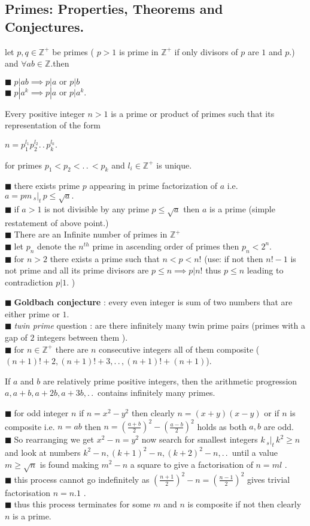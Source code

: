 \documentclass[11pt]{extarticle}
\newcommand{\Z}{\mathbb{Z}}
\newcommand{\w}[1]{\text{#1}}
\newcommand{\ck}{.\,.\,}
\newcommand{\snote}[1]{{\footnotesize(#1)}}
\newcommand{\st}{\,{}_{s}|_t\,}
\newcommand{\tbx}[2][]{
\begin{tcolorbox}[enhanced,breakable,size=small,colback=black!2!white,title={#1},arc is angular, arc=1.5mm,
	drop fuzzy shadow]
	#2
\end{tcolorbox}
}
\newcommand{\y}{$\blacksquare\;$}
\begin{document}
\begin{multicols}{2}
   \section{Primes: Properties, Theorems and Conjectures. }
   let $ p,q \in \Z^+$ be primes \snote{ $ p>1 $ is prime in $ \Z^+ $ if only divisors of $ p $ are $ 1 $ and $ p. $}  and $\forall ab\in \Z.$then
   \tbx{
   	\y $ p|ab \implies p|a\w{ or } p|b $ \\
   	\y $ p|a^k\implies p|a \w{ or } p|a^k.$
   }
   \tbx[Fundamental Theorem of Arithmetic]{ Every positive integer $ n>1 $ is a prime or product of primes such that its representation of the form 
   	\begin{center}
   		$ n=p_1^{l_1}p_2^{l_2}\ck p_k^{l_k} .$
   	\end{center} for primes $ p_1<p_2<\ck <p_k $ and $ l_i\in \Z^+  $   is unique.}
   \tbx{ 
   	\y  there exists prime $ p $ appearing in prime factorization of $ a $ i.e. $ a=pm \st p\leq \sqrt{a}. $ \\
   	\y if $ a>1 $ is not divisible by any prime $ p\leq \sqrt{a} $ then $ a $ is a prime \snote{simple restatement of above point.}\\
   	\y There are an Infinite number of primes in $ \Z^+ $ \\
   	\y let $ p_n $ denote the $ n^{th} $ prime in ascending order of primes then $ p_n<2^n. $\\
   	\y for $ n>2 $ there exists a prime such that $ n<p<n! $ \snote{use: if not then $ n!-1 $ is not prime and all its prime divisors are $ p\leq n \implies p|n! $ thus $ p\leq n $ leading to contradiction $ p|1. $ }\\
   }
   \tbx{ \y \textbf{Goldbach conjecture} : every even integer is sum of two numbers that are either prime or $ 1 $.\\
   	\y \textit{twin prime} question : are there infinitely many twin prime pairs \snote{primes with a gap of $ 2 $ integers between them }.\\
   	\y for $ n\in \Z^+ $ there are $ n $ consecutive integers all of them composite \snote{$(n + 1)! + 2, (n + 1)! + 3, \ck , ( n + 1)! + ( n + 1)  $}.
   	  }
   	  \tbx[Dirichlet theorem]{  If $a$ and $b$ are relatively prime positive integers, then the
   	  	arithmetic progression
   	  	$a, a+ b, a+ 2b, a+ 3b, \ck$
   	  	contains infinitely many primes. }
   
   \tbx[Fermat Kraitchik Factorisation method]{ 
   	\y for odd integer $ n $ if $ n=x^2-y^2 $ then clearly $ n=(x+y)(x-y) $ or if $ n $ is composite i.e. $n=ab $ then $ n=(\frac{ a+b }{2} )^2-(\frac{ a-b }{2} )^2 $ holds  as both $ a,b $ are odd.\\
   	\y So rearranging we get $ x^2-n=y^2 $ now search for smallest integers $ k \st k^2\geq n$ and look at numbers $ k^2-n, (k+1)^2-n,(k+2)^2-n,\ck $ until a value $ m\geq\sqrt{n} $ is found making $ m^2-n $ a square to give a factorisation of $ n=ml $ .\\
   	\y this process cannot go indefinitely as $  (\frac{ n+1 }{2} )^2-n=(\frac{ n-1 }{2}  )^2  $ gives trivial factorisation $ n=n.1 $ .\\
   	\y thus this process terminates for some $ m $ and $ n $ is composite if not then clearly $ n $ is a prime.   }

\end{multicols}
\end{document}
